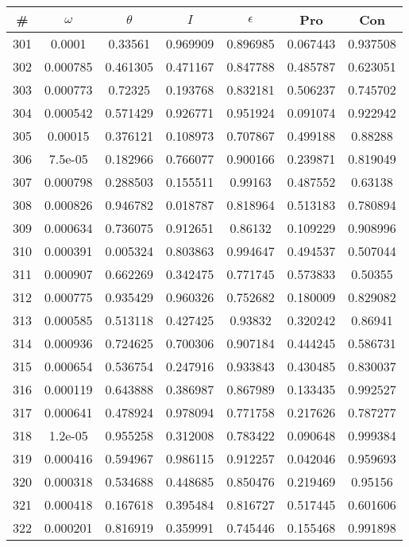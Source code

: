 \newpage
\begin{table}
\begin{tabular}{c|c|c|c|c|c|c}
\# & $\omega$ & $\theta$ & $I$ & $\epsilon$ & Pro & Con\\
\hline
301 & 0.0001 & 0.33561 & 0.969909 & 0.896985 & 0.067443 & 0.937508\\
302 & 0.000785 & 0.461305 & 0.471167 & 0.847788 & 0.485787 & 0.623051\\
303 & 0.000773 & 0.72325 & 0.193768 & 0.832181 & 0.506237 & 0.745702\\
304 & 0.000542 & 0.571429 & 0.926771 & 0.951924 & 0.091074 & 0.922942\\
305 & 0.00015 & 0.376121 & 0.108973 & 0.707867 & 0.499188 & 0.88288\\
306 & 7.5e-05 & 0.182966 & 0.766077 & 0.900166 & 0.239871 & 0.819049\\
307 & 0.000798 & 0.288503 & 0.155511 & 0.99163 & 0.487552 & 0.63138\\
308 & 0.000826 & 0.946782 & 0.018787 & 0.818964 & 0.513183 & 0.780894\\
309 & 0.000634 & 0.736075 & 0.912651 & 0.86132 & 0.109229 & 0.908996\\
310 & 0.000391 & 0.005324 & 0.803863 & 0.994647 & 0.494537 & 0.507044\\
311 & 0.000907 & 0.662269 & 0.342475 & 0.771745 & 0.573833 & 0.50355\\
312 & 0.000775 & 0.935429 & 0.960326 & 0.752682 & 0.180009 & 0.829082\\
313 & 0.000585 & 0.513118 & 0.427425 & 0.93832 & 0.320242 & 0.86941\\
314 & 0.000936 & 0.724625 & 0.700306 & 0.907184 & 0.444245 & 0.586731\\
315 & 0.000654 & 0.536754 & 0.247916 & 0.933843 & 0.430485 & 0.830037\\
316 & 0.000119 & 0.643888 & 0.386987 & 0.867989 & 0.133435 & 0.992527\\
317 & 0.000641 & 0.478924 & 0.978094 & 0.771758 & 0.217626 & 0.787277\\
318 & 1.2e-05 & 0.955258 & 0.312008 & 0.783422 & 0.090648 & 0.999384\\
319 & 0.000416 & 0.594967 & 0.986115 & 0.912257 & 0.042046 & 0.959693\\
320 & 0.000318 & 0.534688 & 0.448685 & 0.850476 & 0.219469 & 0.95156\\
321 & 0.000418 & 0.167618 & 0.395484 & 0.816727 & 0.517445 & 0.601606\\
322 & 0.000201 & 0.816919 & 0.359991 & 0.745446 & 0.155468 & 0.991898\\

\end{tabular}
\end{table}
